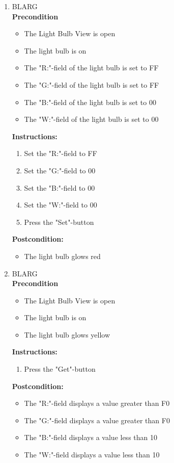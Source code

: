 \documentclass[a4paper]{article}
\newlength{\testlabellength}
\newenvironment{testlist}{\begin{enumerate}[label=\bfseries Instruction \thesubsection.\arabic* , labelindent=0pt, labelwidth=\testlabellength , leftmargin=2cm]}{\end{enumerate}}
\newenvironment{precondition}{
{\color{white}BLARG}\\ 
\textbf{Precondition}
\begin{itemize}[labelindent=0cm, labelwidth=2cm , leftmargin=1cm]
}
{\end{itemize}}
\newenvironment{instruction}{
\textbf{Instructions:}
\begin{enumerate}[label=\bfseries  \arabic*., labelindent=0cm, labelwidth=2cm , leftmargin=1cm]
}
{\end{enumerate}}
\newenvironment{postcondition}{
\textbf{Postcondition:}
\begin{itemize}[labelindent=0cm, labelwidth=2cm , leftmargin=1cm]
}
{\end{itemize}}
\begin{document}
\begin{appendices}
\begin{testlist}
	\item
		\begin{precondition}
			\item The Light Bulb View is open
			\item The light bulb is on
			\item The "R:"-field of the light bulb is set to FF
			\item The "G:"-field of the light bulb is set to FF
			\item The "B:"-field of the light bulb is set to 00
			\item The "W:"-field of the light bulb is set to 00
		\end{precondition}
		\begin{instruction}
			\item Set the "R:"-field to FF
			\item Set the "G:"-field to 00
			\item Set the "B:"-field to 00
			\item Set the "W:"-field to 00
			\item Press the "Set"-button
		\end{instruction}
		\begin{postcondition}
			\item The light bulb glows red
		\end{postcondition}

	\item
		\begin{precondition}
			\item The Light Bulb View is open
			\item The light bulb is on
			\item The light bulb glows yellow
		\end{precondition}
		\begin{instruction}
			\item Press the "Get"-button
		\end{instruction}
		\begin{postcondition}
			\item The "R:"-field displays a value greater than F0
			\item The "G:"-field displays a value greater than F0
			\item The "B:"-field displays a value less than 10
			\item The "W:"-field displays a value less than 10
		\end{postcondition}


\end{testlist}
\end{appendices}
\end{document}
